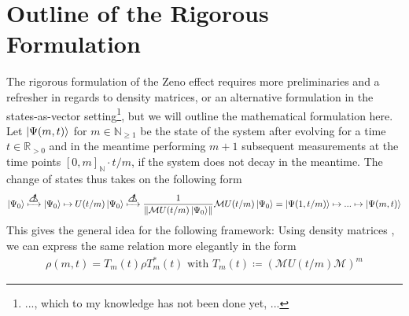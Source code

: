 \documentclass[10pt]{amsart}
\theoremstyle{definition}
\theoremstyle{remark}
\begin{document}
    \section*{Outline of the Rigorous Formulation} The rigorous formulation of the Zeno effect \cite[p. 759]{Tavakoli} requires more preliminaries and a refresher in regards to density matrices, or an alternative formulation in the states-as-vector setting\footnote{..., which to my knowledge has not been done yet, ...}, but we will outline the mathematical formulation here.
    Let \(\ket{\Psi(m, t)}\) for \(m \in \mathbb{N}_{\geq 1}\) be the state of the system after evolving for a time \(t \in \mathbb{R}_{> 0}\) and in the meantime performing \(m+1\) subsequent measurements at the time points \([0, m]_{\mathbb{N}} \cdot t/m\), if the system does not decay in the meantime. The change of states thus takes on the following form
    \newcommand{\measurementsymbol}{
        \begin{tikzpicture}[>=stealth, semithick, scale=1.5]
            \draw (-0.1, 0) -- (0.1, 0);
            \draw (0.1, 0) arc (0:180:0.1);
            \draw[->] (0, 0) -- (75:0.2);
        \end{tikzpicture}
    }
    \begin{align}
        \ket{\Psi_0} \xmapsto{\measurementsymbol} \ket{\Psi_0} \mapsto U(t/m)\ket{\Psi_0} \xmapsto{\measurementsymbol} \frac{1}{\norm{\mathcal{M}U(t/m)\ket{\Psi_0}}} \mathcal{M}U(t/m)\ket{\Psi_0} = \ket{\Psi(1, t/m)} \mapsto ... \mapsto \ket{\Psi(m, t)}
    \end{align}
    This gives the general idea for the following framework: Using density matrices \cite[pp. 98-101]{Nielsen}, we can express the same relation more elegantly in the form
    \begin{align}
        \rho(m, t) = T_m(t) \rho T_m^*(t) \text{ with } T_m(t) \coloneqq (\mathcal{M}U(t/m)\mathcal{M})^m
    \end{align}
\end{document}
